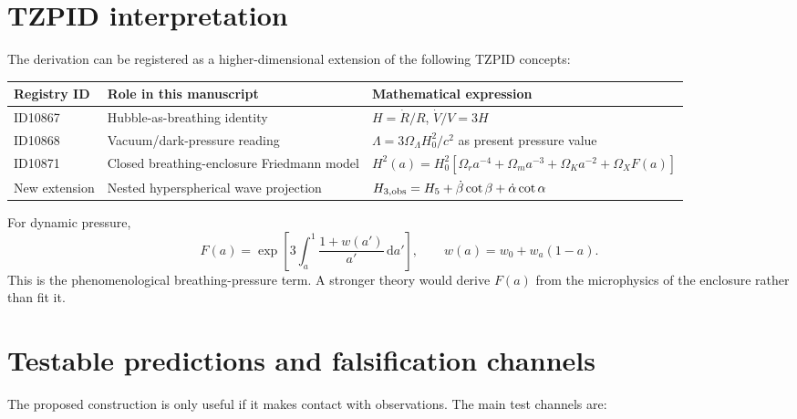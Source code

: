 \documentclass[11pt]{article}
\newcommand{\dd}{\,\mathrm{d}}
\begin{document}
\section{TZPID interpretation}

The derivation can be registered as a higher-dimensional extension of the following TZPID concepts:

\begin{small}
\begin{longtable}{@{}p{}p{}p{}@{}}
\toprule
Registry ID & Role in this manuscript & Mathematical expression \\
\midrule
ID10867 & Hubble-as-breathing identity & $H=\dot R/R$, $\dot V/V=3H$ \\
ID10868 & Vacuum/dark-pressure reading & $\Lambda=3\Omega_\Lambda H_0^2/c^2$ as present pressure value \\
ID10871 & Closed breathing-enclosure Friedmann model & $H^2(a)=H_0^2[\Omega_r a^{-4}+\Omega_m a^{-3}+\Omega_K a^{-2}+\Omega_XF(a)]$ \\
New extension & Nested hyperspherical wave projection & $H_{3,\rm obs}=H_5+\dot\beta\cot\beta+\dot\alpha\cot\alpha$ \\
\bottomrule
\end{longtable}
\end{small}

For dynamic pressure,
\begin{equation}
 F(a)=\exp\left[3\int_a^1\frac{1+w(a')}{a'}\dd a'\right],
 \qquad
 w(a)=w_0+w_a(1-a).
\end{equation}
This is the phenomenological breathing-pressure term.  A stronger theory would derive $F(a)$ from the microphysics of the enclosure rather than fit it.

\section{Testable predictions and falsification channels}

The proposed construction is only useful if it makes contact with observations.  The main test channels are:
\end{document}
